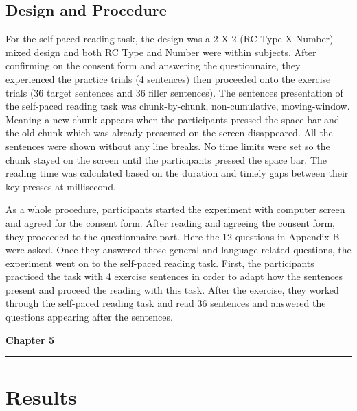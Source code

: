 \documentclass[
]{article}
\begin{document}
\subsection{Design and Procedure}\label{design-and-procedure}

For the self-paced reading task, the design was a 2 X 2 (RC Type X
Number) mixed design and both RC Type and Number were within subjects.
After confirming on the consent form and answering the questionnaire,
they experienced the practice trials (4 sentences) then proceeded onto
the exercise trials (36 target sentences and 36 filler sentences). The
sentences presentation of the self-paced reading task was
chunk-by-chunk, non-cumulative, moving-window. Meaning a new chunk
appears when the participants pressed the space bar and the old chunk
which was already presented on the screen disappeared. All the sentences
were shown without any line breaks. No time limits were set so the chunk
stayed on the screen until the participants pressed the space bar. The
reading time was calculated based on the duration and timely gaps
between their key presses at millisecond.

As a whole procedure, participants started the experiment with computer
screen and agreed for the consent form. After reading and agreeing the
consent form, they proceeded to the questionnaire part. Here the 12
questions in Appendix B were asked. Once they answered those general and
language-related questions, the experiment went on to the self-paced
reading task. First, the participants practiced the task with 4 exercise
sentences in order to adapt how the sentences present and proceed the
reading with this task. After the exercise, they worked through the
self-paced reading task and read 36 sentences and answered the questions
appearing after the sentences.

\newpage

\clearpage
\thispagestyle{empty}  %
\vspace*{-1cm}
\begin{flushleft}
\Huge \textbf{Chapter 5}
\end{flushleft}
\vspace{0.3cm}
\noindent\rule{\linewidth}{0.6pt}
\pagestyle{fancy}  %

\section{Results}\label{results}
\end{document}
